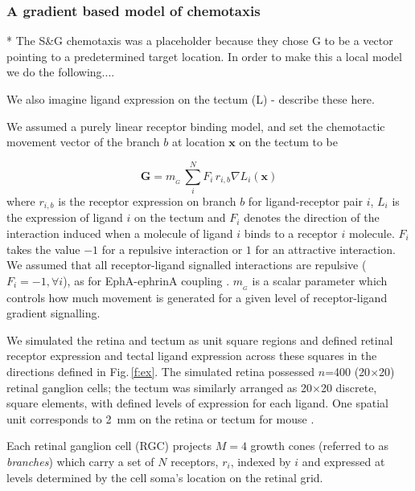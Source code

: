 \documentclass[9pt,lineno,draft]{elife}
\begin{document}
\subsubsection*{A gradient based model of chemotaxis}



* The S\&G chemotaxis was a placeholder because they chose G to be a vector
  pointing to a predetermined target location. In order to make this a local
  model we do the following....

We also imagine ligand expression on the tectum (L) - describe these here.

We assumed a purely linear receptor binding model, and set the chemotactic movement vector of the branch $b$ at location $\mathbf{x}$ on the tectum to be

\begin{equation}\label{e:G}
\mathbf{G} = m_{\!_G}\,\sum_i^N F_i\,r_{i,b} \nabla L_i(\mathbf{x})
\end{equation}
%
where $r_{i,b}$ is the receptor expression on branch $b$ for ligand-receptor pair $i$, $L_i$ is the expression of ligand $i$ on the tectum and $F_i$ denotes the direction of the interaction induced when a molecule of ligand $i$ binds to a receptor $i$ molecule.
$F_i$ takes the value $-1$ for a repulsive interaction or $1$ for an attractive interaction.
%
We assumed that all receptor-ligand signalled interactions are repulsive ($F_i=-1, \forall i$), as for EphA-ephrinA coupling \citep{drescher_vitro_1995,nakamoto_topographically_1996}.
%
$m_{\!_G}$ is a scalar parameter which controls how much movement is generated for a given level of receptor-ligand gradient signalling.

We simulated the retina and tectum as unit square regions and defined retinal receptor expression and tectal ligand expression across these squares in the directions defined in Fig.\,\ref{f:ex}.
The simulated retina possessed $n$=400 (20$\times$20) retinal ganglion cells; the tectum was similarly arranged as 20$\times$20 discrete, square elements, with defined levels of expression for each ligand.
One spatial unit corresponds to 2~mm on the retina or tectum for mouse \citep{reber_relative_2004}.

Each retinal ganglion cell (RGC) projects $M=4$ growth cones (referred to as \emph{branches}) which carry a set of $N$ receptors, $r_i$, indexed by $i$ and expressed at levels determined by the cell soma's location on the retinal grid.
\end{document}
